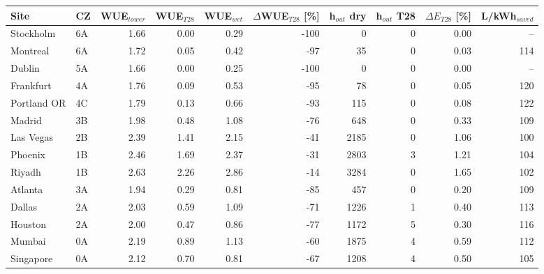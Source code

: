 \begin{tabular}{llrrrrrrrr}
\toprule
Site & CZ & WUE$_{tower}$ & WUE$_{T28}$ & WUE$_{wet}$ & $\Delta$WUE$_{T28}$ [\%] & h$_{out}$ dry & h$_{out}$ T28 & $\Delta E_{T28}$ [\%] & L/kWh$_{saved}$ \\
\midrule
Stockholm & 6A & 1.66 & 0.00 & 0.29 & -100 & 0 & 0 & 0.00 & -- \\
Montreal & 6A & 1.72 & 0.05 & 0.42 & -97 & 35 & 0 & 0.03 & 114 \\
Dublin & 5A & 1.66 & 0.00 & 0.25 & -100 & 0 & 0 & 0.00 & -- \\
Frankfurt & 4A & 1.76 & 0.09 & 0.53 & -95 & 78 & 0 & 0.05 & 120 \\
Portland OR & 4C & 1.79 & 0.13 & 0.66 & -93 & 115 & 0 & 0.08 & 122 \\
Madrid & 3B & 1.98 & 0.48 & 1.08 & -76 & 648 & 0 & 0.33 & 109 \\
Las Vegas & 2B & 2.39 & 1.41 & 2.15 & -41 & 2185 & 0 & 1.06 & 100 \\
Phoenix & 1B & 2.46 & 1.69 & 2.37 & -31 & 2803 & 3 & 1.21 & 104 \\
Riyadh & 1B & 2.63 & 2.26 & 2.86 & -14 & 3284 & 0 & 1.65 & 102 \\
Atlanta & 3A & 1.94 & 0.29 & 0.81 & -85 & 457 & 0 & 0.20 & 109 \\
Dallas & 2A & 2.03 & 0.59 & 1.09 & -71 & 1226 & 1 & 0.40 & 113 \\
Houston & 2A & 2.00 & 0.47 & 0.86 & -77 & 1172 & 5 & 0.30 & 116 \\
Mumbai & 0A & 2.19 & 0.89 & 1.13 & -60 & 1875 & 4 & 0.59 & 112 \\
Singapore & 0A & 2.12 & 0.70 & 0.81 & -67 & 1208 & 4 & 0.50 & 105 \\
\bottomrule
\end{tabular}

